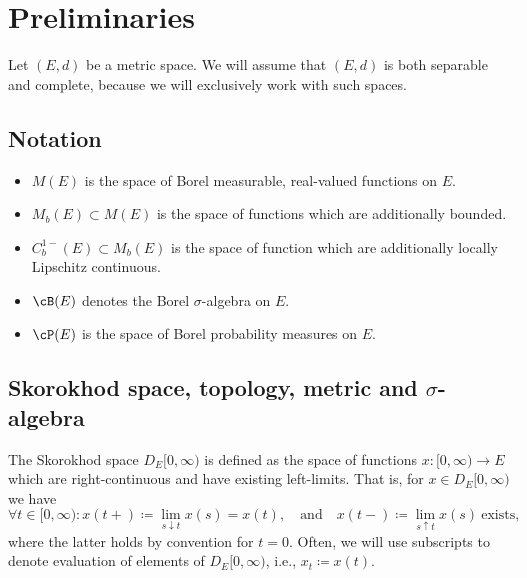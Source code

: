 \section{Preliminaries}

Let \((E,d)\) be a metric space.
We will assume that \((E,d)\) is both separable and complete, because we will exclusively work with such spaces.

\subsection{Notation}
\begin{itemize}
  \item \(M(E)\) is the space of Borel measurable, real-valued functions on \(E\).
  \item \(M_b(E) \subset M(E)\) is the space of functions which are additionally bounded.
  \item \(C_b^{1-}(E) \subset M_b(E)\) is the space of function which are additionally locally Lipschitz continuous.
  \item \(\cB(E)\) denotes the Borel \(\sigma\)-algebra on \(E\).
  \item \(\cP(E)\) is the space of Borel probability measures on \(E\).
\end{itemize}

\subsection{Skorokhod space, topology, metric and \texorpdfstring{\(\sigma\)}{sigma}-algebra}
The Skorokhod space \(D_E[0,\infty)\) is defined as the space of functions \(x : [0,\infty) \to E\) which are right-continuous and have existing left-limits.
That is, for \(x \in D_E[0,\infty)\) we have
\begin{equation}
  \forall t \in [0,\infty) : x(t+) \coloneqq \lim_{s \downarrow t} x(s) = x(t), \quad\text{and}\quad x(t-) \coloneqq \lim_{s \uparrow t} x(s)\ \text{exists},
\end{equation}
where the latter holds by convention for \(t = 0\).
Often, we will use subscripts to denote evaluation of elements of \(D_E[0,\infty)\), i.e., \(x_t \coloneqq x(t)\).

